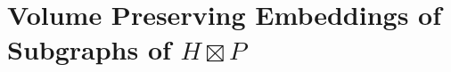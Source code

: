 \documentclass{patmorin}
\renewcommand{\le}{\leqslant}
\begin{document}




%


\section{\boldmath Volume Preserving Embeddings of Subgraphs of $H\boxtimes P$}
\end{document}
